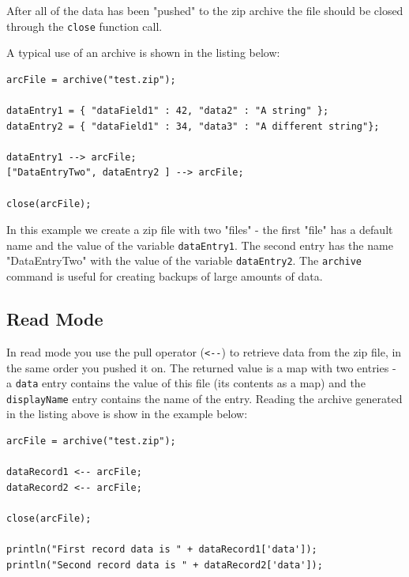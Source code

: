 After all of the data has been "pushed" to the zip archive the file should be closed through the \verb+close+ function call.

A typical use of an archive is shown in the listing below:
\begin{lstlisting}[caption={Write to Archive example}]
arcFile = archive("test.zip");

dataEntry1 = { "dataField1" : 42, "data2" : "A string" };
dataEntry2 = { "dataField1" : 34, "data3" : "A different string"};

dataEntry1 --> arcFile;
["DataEntryTwo", dataEntry2 ] --> arcFile;

close(arcFile);
\end{lstlisting}

In this example we create a zip file with two "files" - the first "file" has a default name and the value of the variable \verb+dataEntry1+. The second entry has the name "DataEntryTwo" with the value of the variable \verb+dataEntry2+. The \verb+archive+ command is useful for creating backups of large amounts of \Rapture data.

\subsection{Read Mode}
In read mode you use the pull operator (\verb+<--+) to retrieve data from the zip file, in the same order you pushed it on. The returned value is a map with two entries - a \verb+data+ entry contains the value of this file (its contents as a map) and the \verb+displayName+ entry contains the name of the entry. Reading the archive generated in the listing above is show in the example below:

\begin{lstlisting}[caption={Read from archive example}]
arcFile = archive("test.zip");

dataRecord1 <-- arcFile;
dataRecord2 <-- arcFile;

close(arcFile);

println("First record data is " + dataRecord1['data']);
println("Second record data is " + dataRecord2['data']);
\end{lstlisting}


